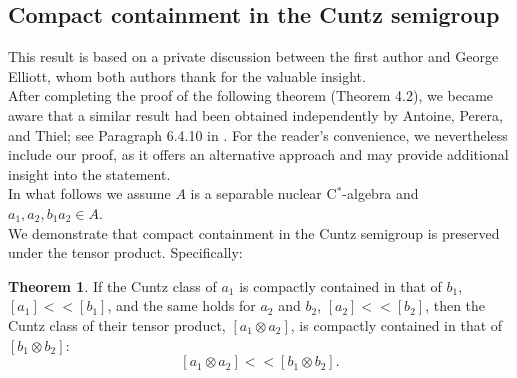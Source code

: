 \documentclass{iopconfser}
\theoremstyle{definition}
\newtheorem{theorem}{Theorem}[section]
\begin{document}
\subsection{Compact containment in the Cuntz semigroup}
This result is based on a private discussion between the first author and George Elliott, whom both authors thank for the valuable insight.\\ 
After completing the proof of the following theorem (Theorem 4.2), we became aware that a similar result had been obtained independently by Antoine, Perera, and Thiel; see Paragraph 6.4.10 in \cite{APT}. For the reader’s convenience, we nevertheless include our proof, as it offers an alternative approach and may provide additional insight into the statement. \\
In what follows we assume $A$ is a separable nuclear C$^*$-algebra and $a_1, a_2, b_1 a_2 \in A$.\\
\indent We demonstrate that compact containment in the Cuntz semigroup is preserved under the tensor product. Specifically: 
\begin{theorem}
If the Cuntz class of $a_1$ is compactly contained in that of $b_1$, $[a_1] << [b_1]$, and the same holds for $a_2$ and $b_2$, $[a_2] << [b_2]$,  then the Cuntz class of their tensor product, $[a_1 \otimes a_2]$, is compactly contained in that of $[b_1 \otimes b_2]$:
$$[a_1 \otimes a_2] << [b_1 \otimes b_2].$$
\end{theorem}
\end{document}
